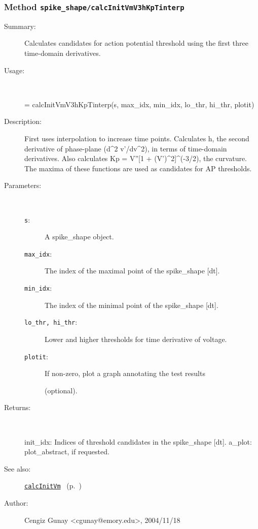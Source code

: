 \subsubsection[Method \texttt{calcInitVmV3hKpTinterp}]{Method \texttt{spike\_shape/calcInitVmV3hKpTinterp}}%
%
\label{ref_spike_shape__calcInitVmV3hKpTinterp}%
\hypertarget{ref_spike_shape__calcInitVmV3hKpTinterp}{}%
\begin{description}
\item[Summary:]Calculates candidates for action potential threshold using the first three time-domain derivatives.
%
\item[Usage:]~%
\begin{lyxcode}%
[init\_idx, a\_plot] = 
   calcInitVmV3hKpTinterp(s, max\_idx, min\_idx, lo\_thr, hi\_thr, plotit)
%
\end{lyxcode}%
%
\item[Description:]%
First uses interpolation to increase time points. Calculates h,
 the second derivative of phase-plane (d\textasciicircum{}2 v'/dv\textasciicircum{}2), in terms of 
 time-domain derivatives. Also calculates Kp = V''[1 + (V')\textasciicircum{}2]\textasciicircum{}(-3/2), 
 the curvature. The maxima of these functions are used as candidates 
 for AP thresholds.
\item[Parameters:]~
\begin{description}%
\item[\texttt{s}:]
 A spike\_shape object.
\item[\texttt{max\_idx}:]
 The index of the maximal point of the spike\_shape [dt].
\item[\texttt{min\_idx}:]
 The index of the minimal point of the spike\_shape [dt].
\item[\texttt{lo\_thr, hi\_thr}:]
 Lower and higher thresholds for time derivative of voltage.
\item[\texttt{plotit}:]
 If non-zero, plot a graph annotating the test results 

(optional).
\end{description}%
%
\item[Returns:
]~

	init\_idx: Indices of threshold candidates in the spike\_shape [dt].
	a\_plot: plot\_abstract, if requested.
%
%
\item[See also:]%
\hyperlink{ref_calcInitVm}{\texttt{calcInitVm}}%
\ (p.~\pageref{ref_calcInitVm})%
%
%
\item[Author:]%
Cengiz Gunay <cgunay@emory.edu>, 2004/11/18
%
\end{description}
\methodline%
